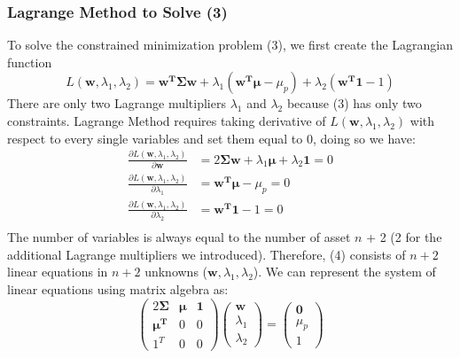 \documentclass[12pt,titlepage,a4paper]{article}
\begin{document}
		\subsubsection{Lagrange Method to Solve (3)}

			To solve the constrained minimization problem (3), we first create the Lagrangian function 
			$$
				L(\mathbf{w}, \lambda_1, \lambda_2) = \mathbf{w^T\Sigma w} + \lambda_1(\mathbf{w^T}\pmb{\mu} - \mu_p) + \lambda_2(\mathbf{w^T1} - 1)
			$$
			There are only two Lagrange multipliers $\lambda_1$ and $\lambda_2$ because (3) has only two constraints. Lagrange Method requires taking derivative of $L(\mathbf{w}, \lambda_1, \lambda_2)$ with respect to every single variables and set them equal to 0, doing so we have: 
			\begin{equation}
				\begin{split}
					\frac{\partial L(\mathbf{w}, \lambda_1, \lambda_2)}{\partial \mathbf{w}} &= 2\mathbf{\Sigma w} + \lambda_1\pmb{\mu} + \lambda_2\mathbf{1} = 0 \\
					\frac{\partial L(\mathbf{w}, \lambda_1, \lambda_2)}{\partial \lambda_1} &=  \mathbf{w^T}\pmb{\mu} - \mu_p = 0\\
					\frac{\partial L(\mathbf{w}, \lambda_1, \lambda_2)}{\partial \lambda_2} &= \mathbf{w^T1} - 1 = 0\\
				\end{split}
			\end{equation}
			The number of variables is always equal to the number of asset $n$ + 2 (2 for the additional Lagrange multipliers we introduced). Therefore, (4) consists of $n+2$ linear equations in $n+2$ unknowns ($\mathbf{w}, \lambda_1, \lambda_2$). We can represent the system of linear equations using matrix algebra as: 
			\begin{equation*}
				\begin{pmatrix} 
					2\mathbf{\Sigma} & \pmb{\mu} & \mathbf{1} \\ \mathbf{\mu^T} & 0 & 0 \\ 1^T & 0 & 0 
				\end{pmatrix} 
				\begin{pmatrix}
					\mathbf{w} \\ \lambda_1 \\ \lambda_2
				\end{pmatrix}
				 = 
				\begin{pmatrix}
					\mathbf{0} \\ \mu_p \\ 1
				\end{pmatrix}
			\end{equation*}
\end{document}
